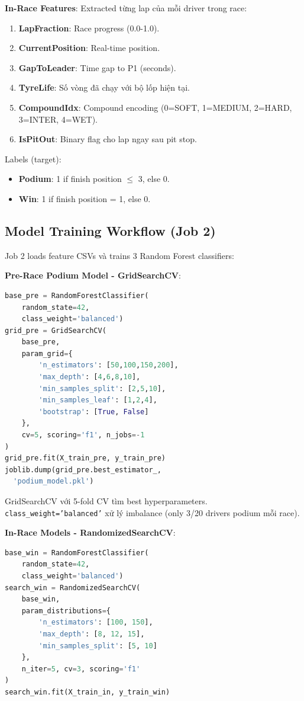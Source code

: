 \documentclass[conference,10pt]{IEEEtran}
\begin{document}
\textbf{In-Race Features}:
Extracted từng lap của mỗi driver trong race:
\begin{enumerate}
    \item \textbf{LapFraction}: Race progress (0.0-1.0).
    \item \textbf{CurrentPosition}: Real-time position.
    \item \textbf{GapToLeader}: Time gap to P1 (seconds).
    \item \textbf{TyreLife}: Số vòng đã chạy với bộ lốp hiện tại.
    \item \textbf{CompoundIdx}: Compound encoding (0=SOFT, 1=MEDIUM, 2=HARD, 3=INTER, 4=WET).
    \item \textbf{IsPitOut}: Binary flag cho lap ngay sau pit stop.
\end{enumerate}

Labels (target):
\begin{itemize}
    \item \textbf{Podium}: 1 if finish position $\leq$ 3, else 0.
    \item \textbf{Win}: 1 if finish position = 1, else 0.
\end{itemize}

\subsection{Model Training Workflow (Job 2)}

Job 2 loads feature CSVs và trains 3 Random Forest classifiers:

\textbf{Pre-Race Podium Model - GridSearchCV}:
\begin{lstlisting}[language=Python]
base_pre = RandomForestClassifier(
    random_state=42,
    class_weight='balanced')
grid_pre = GridSearchCV(
    base_pre,
    param_grid={
        'n_estimators': [50,100,150,200],
        'max_depth': [4,6,8,10],
        'min_samples_split': [2,5,10],
        'min_samples_leaf': [1,2,4],
        'bootstrap': [True, False]
    },
    cv=5, scoring='f1', n_jobs=-1
)
grid_pre.fit(X_train_pre, y_train_pre)
joblib.dump(grid_pre.best_estimator_,
  'podium_model.pkl')
\end{lstlisting}

GridSearchCV với 5-fold CV tìm best hyperparameters. \texttt{class\_weight='balanced'} xử lý imbalance (only 3/20 drivers podium mỗi race).

\textbf{In-Race Models - RandomizedSearchCV}:
\begin{lstlisting}[language=Python]
base_win = RandomForestClassifier(
    random_state=42,
    class_weight='balanced')
search_win = RandomizedSearchCV(
    base_win,
    param_distributions={
        'n_estimators': [100, 150],
        'max_depth': [8, 12, 15],
        'min_samples_split': [5, 10]
    },
    n_iter=5, cv=3, scoring='f1'
)
search_win.fit(X_train_in, y_train_win)
\end{lstlisting}
\end{document}

